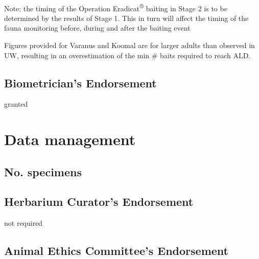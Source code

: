 \documentclass[version=last,
    paper=a4,                               %
    10pt,                                   %
    dvipsnames,
    oneside,                              %
    headings=openany,                       %
    open=any,
    BCOR=7mm,                               %
    DIV=15,     %
]{scrbook}
\begin{document}
~

~

~

~

~

~

~

~

~

~

~

~

~

~

~

~

Note: the timing of the Operation Eradicat\textsuperscript{®} baiting in
Stage 2 is to be determined by the results of Stage 1. This in turn will
affect the timing of the fauna monitoring before, during and after the
baiting event

Figures provided for Varanus and Koomal are for larger adults than
observed in UW, resulting in an overestimation of the min \# baits
required to reach ALD.




\subsection*{Biometrician's Endorsement}

granted



\section*{Data management}


\subsection*{No. specimens}






\subsection*{Herbarium Curator's Endorsement}

not required




\subsection*{Animal Ethics Committee's Endorsement}
\end{document}

